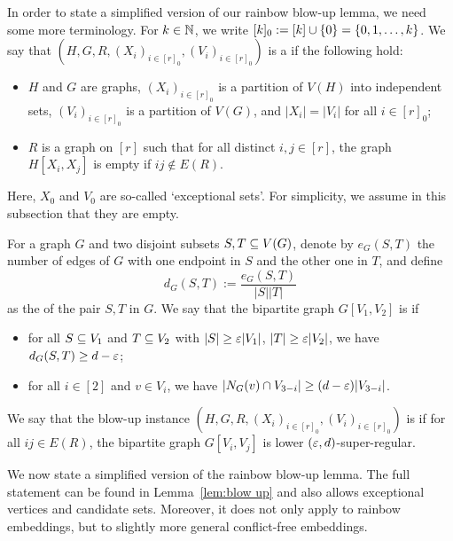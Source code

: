 \documentclass[10pt]{amsart}
\theoremstyle{definition}
\theoremstyle{claimstyle}
\theoremstyle{stepstyle}
\numberwithin{equation}{section}
\begin{document}
In order to state a simplified version of our rainbow blow-up lemma,
we need some more terminology.
For $k\in \mathbb{N}$, we write $[k]_0:=[k]\cup \{0\}=\{0,1,\dots,k\}$. We say that $(H,G,R,(X_i)_{i\in[r]_0},(V_i)_{i\in[r]_0})$ is a  if the following hold:
\begin{itemize}
\item $H$ and $G$ are graphs, $(X_i)_{i\in[r]_0}$ is a partition of $V(H)$ into independent sets, $(V_i)_{i\in[r]_0}$ is a partition of $V(G)$, and $|X_i|=|V_i|$ for all $i\in[r]_0$;
\item $R$ is a graph on $[r]$ such that for all distinct $i,j\in [r]$, the graph $H[X_i,X_j]$ is empty if $ij\notin E(R)$.
\end{itemize}
Here, $X_0$ and $V_0$ are so-called `exceptional sets'. For simplicity, we assume in this subsection that they are empty. 

For a graph $G$ and two disjoint subsets $S,T\subseteq V(G)$, denote by $e_G(S,T)$ the number of edges of $G$ with one endpoint in $S$ and the other one in $T$, and define $$d_G(S,T):=\frac{e_G(S,T)}{|S||T|}$$ as the  of the pair $S,T$ in $G$.
We say that the bipartite graph $G[V_1,V_2]$ is 
if
\begin{itemize}
\item for all $S\subseteq V_1$ and $T\subseteq V_2$ with $|S|\ge {\varepsilon}|V_1|$, $|T|\ge {\varepsilon} |V_2|$, we have $d_G(S,T)\ge d-{\varepsilon}$;
\item for all $i\in [2]$ and $v\in V_i$, we have $|N_G(v)\cap V_{3-i}|\ge (d-{\varepsilon})|V_{3-i}|$.
\end{itemize}

We say that the blow-up instance $(H,G,R,(X_i)_{i\in[r]_0},(V_i)_{i\in[r]_0})$ is  if for all $ij\in E(R)$, the bipartite graph $G[V_i,V_j]$ is lower $({\varepsilon},d)$-super-regular.


We now state a simplified version of the rainbow blow-up lemma. The full statement can be found in Lemma~\ref{lem:blow up} and also allows exceptional vertices and candidate sets. Moreover, it does not only apply to rainbow embeddings, but to slightly more general conflict-free embeddings.
\end{document}
